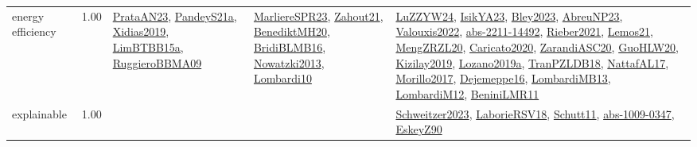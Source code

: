 {\begin{longtable}{p{3cm}r>{\raggedright\arraybackslash}p{6cm}>{\raggedright\arraybackslash}p{6cm}>{\raggedright\arraybackslash}p{8cm}}
\index{energy efficiency}\index{Concepts!energy efficiency}energy efficiency &  1.00 & \hyperref[detail:PrataAN23]{PrataAN23}, \hyperref[detail:PandeyS21a]{PandeyS21a}, \hyperref[detail:Xidias2019]{Xidias2019}, \hyperref[detail:LimBTBB15a]{LimBTBB15a}, \hyperref[detail:RuggieroBBMA09]{RuggieroBBMA09} & \hyperref[detail:MarliereSPR23]{MarliereSPR23}, \hyperref[detail:Zahout21]{Zahout21}, \hyperref[detail:BenediktMH20]{BenediktMH20}, \hyperref[detail:BridiBLMB16]{BridiBLMB16}, \hyperref[detail:Nowatzki2013]{Nowatzki2013}, \hyperref[detail:Lombardi10]{Lombardi10} & \hyperref[detail:LuZZYW24]{LuZZYW24}, \hyperref[detail:IsikYA23]{IsikYA23}, \hyperref[detail:Bley2023]{Bley2023}, \hyperref[detail:AbreuNP23]{AbreuNP23}, \hyperref[detail:Valouxis2022]{Valouxis2022}, \hyperref[detail:abs-2211-14492]{abs-2211-14492}, \hyperref[detail:Rieber2021]{Rieber2021}, \hyperref[detail:Lemos21]{Lemos21}, \hyperref[detail:MengZRZL20]{MengZRZL20}, \hyperref[detail:Caricato2020]{Caricato2020}, \hyperref[detail:ZarandiASC20]{ZarandiASC20}, \hyperref[detail:GuoHLW20]{GuoHLW20}, \hyperref[detail:Kizilay2019]{Kizilay2019}, \hyperref[detail:Lozano2019a]{Lozano2019a}, \hyperref[detail:TranPZLDB18]{TranPZLDB18}, \hyperref[detail:NattafAL17]{NattafAL17}, \hyperref[detail:Morillo2017]{Morillo2017}, \hyperref[detail:Dejemeppe16]{Dejemeppe16}, \hyperref[detail:LombardiMB13]{LombardiMB13}, \hyperref[detail:LombardiM12]{LombardiM12}, \hyperref[detail:BeniniLMR11]{BeniniLMR11}\\
\index{explainable}\index{Concepts!explainable}explainable &  1.00 &  &  & \hyperref[detail:Schweitzer2023]{Schweitzer2023}, \hyperref[detail:LaborieRSV18]{LaborieRSV18}, \hyperref[detail:Schutt11]{Schutt11}, \hyperref[detail:abs-1009-0347]{abs-1009-0347}, \hyperref[detail:EskeyZ90]{EskeyZ90}\\

\end{longtable}}
